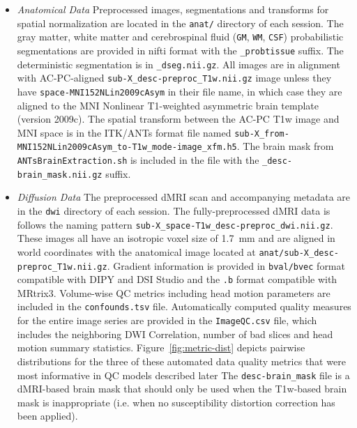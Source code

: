 \documentclass[fleqn,10pt,inline]{wlscirep}
\begin{document}
\begin{itemize}
    \item \emph{Anatomical Data} Preprocessed images, segmentations and transforms for spatial normalization are located in the \texttt{anat/} directory of each session. The gray matter, white matter and  cerebrospinal fluid (\texttt{GM}, \texttt{WM}, \texttt{CSF}) probabilistic segmentations are provided in nifti format with the \texttt{\_probtissue} suffix. The deterministic  segmentation is in \texttt{\_dseg.nii.gz}. All images are in alignment with AC-PC-aligned  \texttt{sub-X\_desc-preproc\_T1w.nii.gz} image unless they have \texttt{space-MNI152NLin2009cAsym} in their file name, in which case they are aligned to the MNI Nonlinear T1-weighted asymmetric brain template (version 2009c)\cite{Fonov2009-ze}. The spatial transform between the AC-PC T1w image and MNI space is in the ITK/ANTs format file named \texttt{sub-X\_from-MNI152NLin2009cAsym\_to-T1w\_mode-image\_xfm.h5}. The brain mask from \texttt{ANTsBrainExtraction.sh} is included in the file with the \texttt{\_desc-brain\_mask.nii.gz} suffix.

    \item \emph{Diffusion Data} The preprocessed dMRI scan and accompanying metadata are in the  \texttt{dwi} directory of each session. The fully-preprocessed dMRI data is follows the naming pattern \texttt{sub-X\_space-T1w\_desc-preproc\_dwi.nii.gz}. These images all have an isotropic voxel size of \qty{1.7}{\mm} and are aligned in world coordinates with the anatomical image located at \texttt{anat/sub-X\_desc-preproc\_T1w.nii.gz}. Gradient information is provided in \texttt{bval/bvec} format compatible with DIPY and DSI Studio and the \texttt{.b} format compatible with MRtrix3. Volume-wise QC metrics including head motion parameters are included in the \texttt{confounds.tsv} file. Automatically computed quality measures for the entire image series are provided in the \texttt{ImageQC.csv} file, which includes the neighboring DWI Correlation, number of bad slices and head motion summary statistics.
    Figure~\ref{fig:metric-dist} depicts pairwise distributions for the three of these automated data quality metrics that were most informative in QC models described later
    The \texttt{desc-brain\_mask} file is a dMRI-based brain mask that should only be used when the T1w-based brain mask is inappropriate (i.e. when no susceptibility distortion correction has been applied).
\end{itemize}
\end{document}
